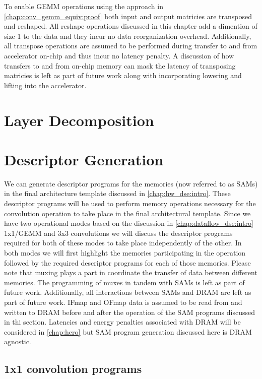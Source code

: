 To enable GEMM operations using the approach in
\autoref{chap:conv_gemm_equiv:proof} both input and output matricies are
transposed and reshaped. All reshape operations discussed in this chapter add a
dimention of size 1 to the data and they incur no data reorganization overhead.
Additionally, all transpose operations are assumed to be performed during
transfer to and from accelerator on-chip and thus incur no latency penalty. A
discussion of how transfers to and from on-chip memory can mask the latency of
transposing matricies is left as part of future work along with incorporating
lowering and lifting into the accelerator. 


\section{Layer Decomposition}


\section{Descriptor Generation}
\label{chap:sams:acc_scheduling}

We can generate descriptor programs for the memories (now referred to as SAMs)
in the final architecture template discussed in \autoref{chap:hw_dse:intro}.
These descriptor programs will be used to perform memory operations necessary
for the convolution operation to take place in the final architectural template.
Since we have two operational modes based on the discussion in
\autoref{chap:dataflow_dse:intro} 1x1/GEMM and 3x3 convolutions we will discuss the
descriptor programs required for both of these modes to take place independently of
the other. In both modes we will first highlight the memories participating in
the operation followed by the required descriptor programs for each of those
memories. Please note that muxing plays a part in coordinate the transfer of
data between different memories. The programming of muxes in tandem with SAMs is
left as part of future work. Additionally, all interactions between SAMs and
DRAM are left as part of future work. IFmap and OFmap data is assumed to be read
from and written to DRAM before and after the operation of the SAM programs
discussed in thi section. Latencies and energy penalties associated with DRAM
will be considered in \autoref{chap:hero} but SAM program generation discussed
here is DRAM agnostic.

\subsection{1x1 convolution programs}
\label{chap:sams:acc_scheduling:1x1}

